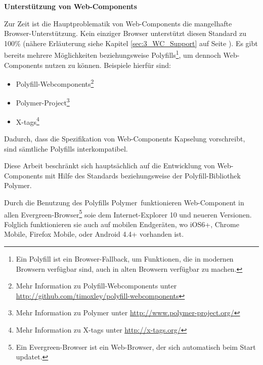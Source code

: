\textbf{Unterstützung von Web-Components}

Zur Zeit ist die Hauptproblematik von Web-Components die mangelhafte Browser-Unterstützung. Kein einziger Browser unterstützt diesen Standard zu 100\% (nähere Erläuterung siehe Kapitel \ref{sec:3_WC_Support} auf Seite \pageref{sec:3_WC_Support}). Es gibt bereits mehrere Möglichkeiten beziehungsweise Polyfills\footnote{Ein Polyfill ist ein Browser-Fallback, um Funktionen, die in modernen Browsern verfügbar sind, auch in alten Browsern verfügbar zu machen.}, um dennoch Web-Components nutzen zu können. Beispiele hierfür sind:
\begin{itemize}
\item Polyfill-Webcomponents\footnote{Mehr Information zu Polyfill-Webcomponents unter \href{http://github.com/timoxley/polyfill-webcomponents}{http://github.com/timoxley/polyfill-webcomponents}}
\item Polymer-Project\footnote{Mehr Information zu Polymer unter \href{http://www.polymer-project.org/}{http://www.polymer-project.org/}}
\item X-tags\footnote{Mehr Information zu X-tags unter \href{http://x-tags.org/}{http://x-tags.org/}}
\end{itemize}

Dadurch, dass die Spezifikation von Web-Components Kapselung vorschreibt, sind sämtliche Polyfills interkompatibel.

Diese Arbeit beschränkt sich hauptsächlich auf die Entwicklung von Web-Components mit Hilfe des Standards beziehungsweise der Polyfill-Bibliothek Polymer.

Durch die Benutzung des Polyfills \glqq Polymer\grqq\ funktionieren Web-Component in allen \glqq Evergreen\grqq -Browser\footnote{Ein \glqq Evergreen\grqq -Browser ist ein Web-Browser, der sich automatisch beim Start updatet.} soie dem Internet-Explorer 10 und neueren Versionen. Folglich funktionieren sie auch auf mobilen Endgeräten, wo iOS6+, Chrome Mobile, Firefox Mobile, oder Android 4.4+ vorhanden ist.